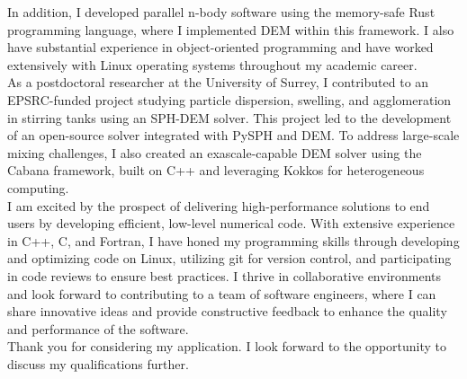 \documentclass[11pt,a4paper,roman]{moderncv}
\begin{document}
\vspace{1em}
In addition, I developed parallel n-body software using the
memory-safe Rust programming language, where I implemented DEM within
this framework. I also have substantial experience in object-oriented
programming and have worked extensively with Linux operating systems
throughout my academic career.\\


\vspace{1em}
As a postdoctoral researcher at the University of Surrey, I
contributed to an EPSRC-funded project studying particle dispersion,
swelling, and agglomeration in stirring tanks using an SPH-DEM
solver. This project led to the development of an open-source solver
integrated with PySPH and DEM. To address large-scale mixing
challenges, I also created an exascale-capable DEM solver using the
Cabana framework, built on C++ and leveraging Kokkos for heterogeneous
computing.\\



\vspace{1em}
I am excited by the prospect of delivering high-performance solutions
to end users by developing efficient, low-level numerical code. With
extensive experience in C++, C, and Fortran, I have honed my
programming skills through developing and optimizing code on Linux,
utilizing git for version control, and participating in code reviews
to ensure best practices. I thrive in collaborative environments and
look forward to contributing to a team of software engineers, where I
can share innovative ideas and provide constructive feedback to
enhance the quality and performance of the software.\\



\vspace{1em}
Thank you for considering my application. I look forward to the
opportunity to discuss my qualifications further.\\



\vspace{0.5cm}


\makeletterclosing
\end{document}

